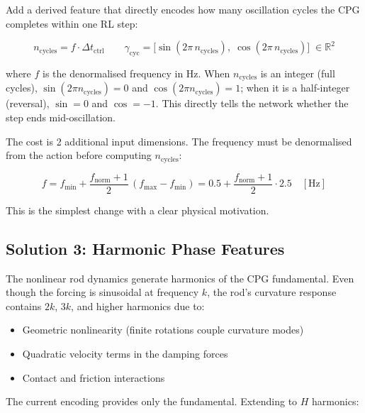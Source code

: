 \documentclass[11pt]{article}
\newcommand{\Real}{\mathbb{R}}
\begin{document}
Add a derived feature that directly encodes how many oscillation cycles the CPG
completes within one RL step:

\begin{equation}
  n_{\mathrm{cycles}} = f \cdot \Delta t_{\mathrm{ctrl}}
  \qquad
  \gamma_{\mathrm{cyc}} = \bigl[\sin(2\pi\, n_{\mathrm{cycles}}),\;
                                 \cos(2\pi\, n_{\mathrm{cycles}})\bigr]
  \;\in \Real^2
  \label{eq:ncycles-enc}
\end{equation}

\noindent
where $f$ is the denormalised frequency in Hz.
When $n_{\mathrm{cycles}}$ is an integer (full cycles), $\sin(2\pi n_{\mathrm{cycles}}) = 0$
and $\cos(2\pi n_{\mathrm{cycles}}) = 1$; when it is a half-integer (reversal),
$\sin = 0$ and $\cos = -1$.
This directly tells the network whether the step ends mid-oscillation.

The cost is 2 additional input dimensions.
The frequency must be denormalised from the action before computing $n_{\mathrm{cycles}}$:

\begin{equation}
  f = f_{\min} + \frac{f_{\mathrm{norm}} + 1}{2}\,(f_{\max} - f_{\min})
  = 0.5 + \frac{f_{\mathrm{norm}} + 1}{2} \cdot 2.5
  \quad [\text{Hz}]
\end{equation}

This is the simplest change with a clear physical motivation.

\subsection{Solution 3: Harmonic Phase Features}
\label{sec:harmonics}

The nonlinear rod dynamics generate harmonics of the CPG fundamental.
Even though the forcing is sinusoidal at frequency $k$, the rod's curvature
response contains $2k$, $3k$, and higher harmonics due to:

\begin{itemize}
  \item Geometric nonlinearity (finite rotations couple curvature modes)
  \item Quadratic velocity terms in the damping forces
  \item Contact and friction interactions
\end{itemize}

\noindent
The current encoding provides only the fundamental.
Extending to $H$ harmonics:
\end{document}
